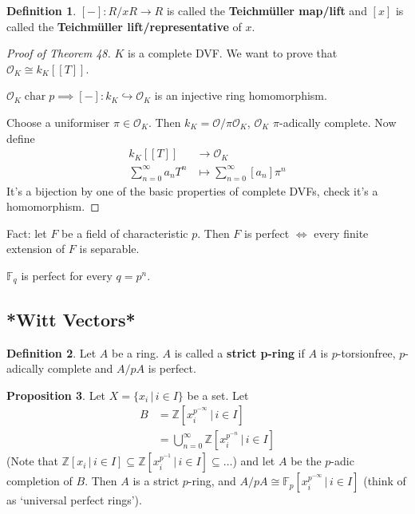\documentclass[a4paper]{article}
\theoremstyle{definition}
\newtheorem{definition}{Definition}
\theoremstyle{default}
\newtheorem{prop}[definition]{Proposition}
\theoremstyle{remark}
\DeclareMathOperator{\characteristic}{char}
\begin{document}
\begin{definition}
	$[-]:R/xR \to R$ is called the \textbf{Teichm\"uller map/lift}
	and $[x]$ is called the \textbf{Teichm\"uller lift/representative} of $x$.
\end{definition}
\begin{proof}[Proof of Theorem 48]
	$K$ is a complete DVF.
	We want to prove that $\mathcal{O}_K \cong k_K[[T]]$.
	
	$\mathcal{O}_K \characteristic p \implies [-]:k_K \hookrightarrow \mathcal{O}_K$ is an injective ring homomorphism.
	
	Choose a uniformiser $\pi \in \mathcal{O}_K$. Then
	$k_K = \mathcal{O}/\pi\mathcal{O}_K$, $\mathcal{O}_K$ $\pi$-adically complete.
	Now define
	\begin{align*}
		k_K[[T]] &\to \mathcal{O}_K \\
		\sum_{n=0}^\infty a_n T^n &\mapsto \sum_{n=0}^\infty [a_n] \pi^n
	\end{align*}
	It's a bijection by one of the basic properties of complete DVFs, check it's a homomorphism.
\end{proof}

Fact: let $F$ be a field of characteristic $p$. Then $F$ is perfect $\iff$ every finite extension of $F$ is separable.

$\mathbb{F}_q$ is perfect for every $q=p^n$.

\subsection{*Witt Vectors*}

\begin{definition}
	Let $A$ be a ring. $A$ is called a \textbf{strict p-ring} if $A$ is $p$-torsionfree,
	$p$-adically complete and $A/pA$ is perfect.
\end{definition}

\begin{prop}
	Let $X = \{x_i \,|\, i \in I\}$ be a set.
	Let
	\begin{align*}
	B &= \mathbb{Z}[x_i^{p^{-\infty}} \,|\, i \in I]\\
	&= \bigcup_{n=0}^\infty \mathbb{Z}[x_i^{p^{-n}} \,|\, i \in I]
	\end{align*}
	(Note that $\mathbb{Z}[x_i \,|\, i \in I] \subseteq \mathbb{Z}[x_i^{p^{-1}} \,|\, i \in I] \subseteq \dots$)
	and let $A$ be the $p$-adic completion of $B$. Then $A$ is a strict $p$-ring,
	and $A/pA \cong \mathbb{F}_p[x_i^{p^{-\infty}} \,|\, i \in I]$ (think of as `universal perfect rings').
\end{prop}
\end{document}
